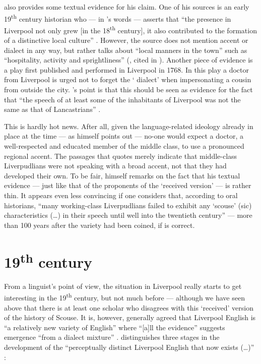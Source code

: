 \textcite{crowley2012} also provides some textual evidence for his claim. One of his sources is an early 19\textsuperscript{th} century historian who --- in \citeauthor{crowley2012}'s words --- asserts that ``the  presence in Liverpool not only grew [in the 18\textsuperscript{th} century], it also contributed to the formation of a distinctive local culture'' \citeyearpar[30]{crowley2012}.
However, the source does not mention accent or dialect in any way, but rather talks about ``local manners in the town'' such as ``hospitality, activity and sprightliness'' (\citealt{troughton1810}, cited in \citealt[30]{crowley2012}).
Another piece of evidence is a play first published and performed in Liverpool in 1768.
In this play a doctor from Liverpool is urged not to forget the ` dialect' when impersonating a cousin from outside the city.
\citeauthor{crowley2012}'s point is that this should be seen as evidence for the fact that ``the speech of at least some of the inhabitants of Liverpool was not the same as that of Lancastrians'' \parencite[cf.][32--35]{crowley2012}.

This is hardly hot news.
After all, given the language-related ideology already in place at the time --- as \citeauthor{crowley2012} himself points out \citeyearpar[23]{crowley2012} --- no-one would expect a doctor, a well-respected and educated member of the middle class, to use a pronounced regional accent.
The passages that \citeauthor{crowley2012} quotes merely indicate that middle-class Liverpudlians were not speaking with a broad  accent, not that they had developed their own.
To be fair, \citeauthor{crowley2012} himself remarks on the fact that his textual evidence --- just like that of the proponents of the `received version' --- is rather thin.
It appears even less convincing if one considers that, according to oral historians, ``many working-class Liverpudlians failed to exhibit any `scouse' (sic) characteristics (\ldots) in their speech until well into the twentieth century''  \citep[43--44]{belchem2006d} --- more than 100 years after the variety had been coined, if \citeauthor{crowley2012} is correct.


	\section{19\textsuperscript{th} century}\label{sec.hist.19}

From a linguist's point of view, the situation in Liverpool really starts to get interesting in the 19\textsuperscript{th} century, but not much before --- although we have seen above that there is at least one scholar who disagrees with this `received' version of the history of Scouse.
It is, however, generally agreed that Liverpool English is ``a relatively new variety of English'' where ``[a]ll the evidence'' suggests emergence ``from a dialect mixture'' \citep[113 and 121]{honeybone2007}.
\citeauthor{honeybone2007} distinguishes three stages in the development of the ``perceptually distinct Liverpool English that now exists (\dots)'' \citeyearpar[119]{honeybone2007}:

